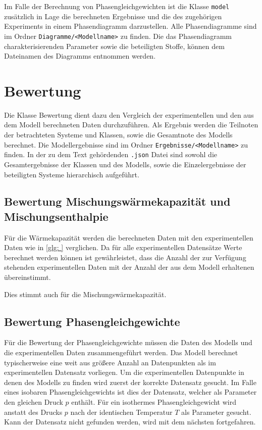 \documentclass[../thesis.tex]{subfiles}
\begin{document}
Im Falle der Berechnung von Phasengleichgewichten ist die Klasse \texttt{model} zusätzlich in Lage die berechneten Ergebnisse und die des zugehörigen Experiments in einem Phasendiagramm darzustellen. Alle Phasendiagramme sind im Ordner \texttt{Diagramme/<Modellname>} zu finden. Die das Phasendiagramm charakterisierenden Parameter sowie die beteiligten Stoffe, können dem Dateinamen des Diagramms entnommen werden.

\section{Bewertung}

Die Klasse Bewertung dient dazu den Vergleich der experimentellen und den aus dem Modell berechneten Daten durchzuführen. Als Ergebnis werden die Teilnoten der betrachteten Systeme und Klassen, sowie die Gesamtnote des Modells berechnet. Die Modellergebnisse sind im Ordner \texttt{Ergebnisse/<Modellname>} zu finden. In der zu dem Text gehördenden \texttt{.json} Datei sind sowohl die Gesamtergebnisse der Klassen und des Modells, sowie die Einzelergebnisse der beteiligten Systeme hierarchisch aufgeführt.

\subsection{Bewertung Mischungswärmekapazität und Mischungsenthalpie}

Für die Wärmekapazität werden die berechneten Daten mit den experimentellen Daten wie in \autoref{glg: } verglichen. Da für alle experimentellen Datensätze Werte berechnet werden können ist gewährleistet, dass die Anzahl der zur Verfügung stehenden experimentellen Daten mit der Anzahl der aus dem Modell erhaltenen übereinstimmt.

Dies stimmt auch für die Mischungswärmekapazität.

\subsection{Bewertung Phasengleichgewichte}

Für die Bewertung der Phasengleichgewichte müssen die Daten des Modells und die experimentellen Daten zusammengeführt werden. Das Modell berechnet typischerweise eine weit aus größere Anzahl an Datenpunkten als im experimentellen Datensatz vorliegen.  Um die experimentellen Datenpunkte in denen des Modells zu finden wird zuerst der korrekte Datensatz gesucht. Im Falle eines isobaren Phasengleichgewichts ist dies der Datensatz, welcher als Parameter den gleichen Druck $p$ enthält. Für ein isothermes Phasengleichgewicht wird anstatt des Drucks $p$ nach der identischen Temperatur $T$ als Parameter gesucht. Kann der Datensatz nicht gefunden werden, wird mit dem nächsten fortgefahren.
\end{document}
